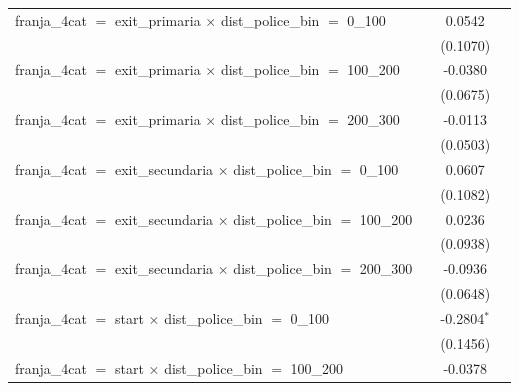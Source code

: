 \begin{tabular}{lccc}
   franja\_4cat $=$ exit\_primaria $\times$ dist\_police\_bin $=$ 0\_100           &                 & 0.0542               &   \\   
                                                                                   &                 & (0.1070)             &   \\   
   franja\_4cat $=$ exit\_primaria $\times$ dist\_police\_bin $=$ 100\_200         &                 & -0.0380              &   \\   
                                                                                   &                 & (0.0675)             &   \\   
   franja\_4cat $=$ exit\_primaria $\times$ dist\_police\_bin $=$ 200\_300         &                 & -0.0113              &   \\   
                                                                                   &                 & (0.0503)             &   \\   
   franja\_4cat $=$ exit\_secundaria $\times$ dist\_police\_bin $=$ 0\_100         &                 & 0.0607               &   \\   
                                                                                   &                 & (0.1082)             &   \\   
   franja\_4cat $=$ exit\_secundaria $\times$ dist\_police\_bin $=$ 100\_200       &                 & 0.0236               &   \\   
                                                                                   &                 & (0.0938)             &   \\   
   franja\_4cat $=$ exit\_secundaria $\times$ dist\_police\_bin $=$ 200\_300       &                 & -0.0936              &   \\   
                                                                                   &                 & (0.0648)             &   \\   
   franja\_4cat $=$ start $\times$ dist\_police\_bin $=$ 0\_100                    &                 & -0.2804$^{*}$        &   \\   
                                                                                   &                 & (0.1456)             &   \\   
   franja\_4cat $=$ start $\times$ dist\_police\_bin $=$ 100\_200                  &                 & -0.0378              &   \\   

\end{tabular}
